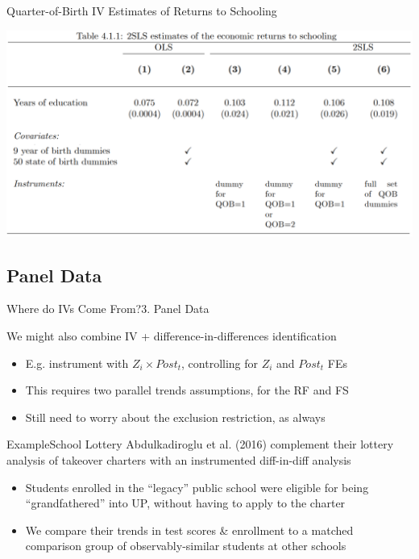 \documentclass{beamer}
\begin{document}
\begin{frame}{Quarter-of-Birth IV Estimates of Returns to Schooling}

\begin{center}
\includegraphics[scale=0.32]{./lecture_includes/qob2.png}
\end{center}

\end{frame}

\subsection{Panel Data}
\begin{frame}{Where do IVs Come From?}{3. Panel Data}

We might also combine IV + difference-in-differences identification
\begin{itemize}
  \item E.g. instrument with $Z_i\times Post_t$, controlling for $Z_i$ and $Post_t$ FEs

  \item This requires two parallel trends assumptions, for the RF and FS

  \item Still need to worry about the exclusion restriction, as always
\end{itemize}
\end{frame}

\begin{frame}{Example}{School Lottery}
Abdulkadiroglu et al. (2016) complement their lottery analysis of takeover charters with an instrumented diff-in-diff analysis
\begin{itemize}
  \item Students enrolled in the ``legacy'' public school were eligible for being ``grandfathered'' into UP, without having to apply to the charter

  \item We compare their trends in test scores \& enrollment to a matched comparison group of observably-similar students at other schools
\end{itemize}
\end{frame}
\end{document}
